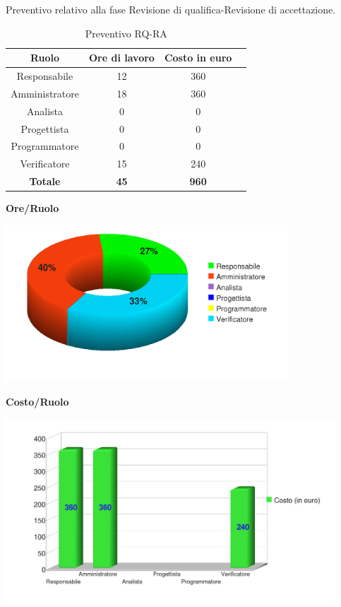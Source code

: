 Preventivo relativo alla fase Revisione di qualifica-Revisione di accettazione.
\begin{table}[h]
	\begin{center}
		  \begin{tabular}{|c|c|c|c|}
		 \hline 
		 \textbf{Ruolo} & \textbf{Ore di lavoro} & \textbf{Costo in euro}\\
		 \hline
		Responsabile & 12 & 360 \\
		Amministratore & 18 & 360\\
		Analista & 0 & 0\\
		Progettista & 0 & 0\\
		Programmatore & 0 & 0 \\
		Verificatore & 15 & 240\\
        \hline
        \textbf{Totale} & \textbf{45} & \textbf{960}\\
		\hline
		\end{tabular}
	\caption{Preventivo RQ-RA} 
	\label{tab:tabella_RQ-RA}
	\end{center}	
\end{table}


\begin{center}\textbf{Ore/Ruolo}
\end{center}
\includegraphics[width=300pt]{RQ-RA_Ore}
\newpage
\begin{center}\textbf{Costo/Ruolo}
\end{center}
\includegraphics[width=350pt]{RQ-RA_Costi}


